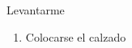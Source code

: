 \item Levantarme
  \begin{enumerate}
  \def\labelenumi{\arabic{enumi}.}
  \item Colocarse el calzado
  \end{enumerate}
